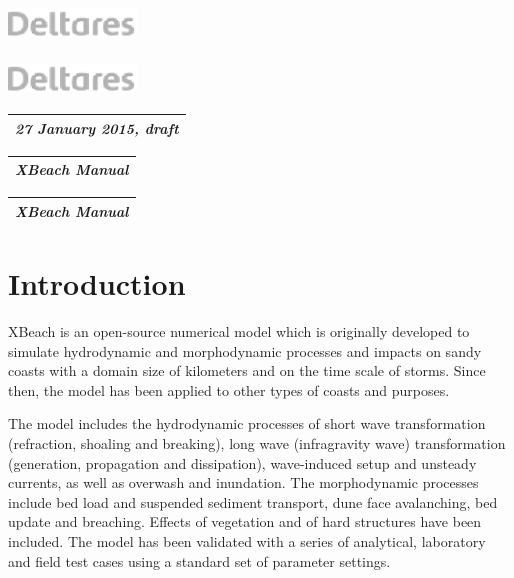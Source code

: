 \documentclass{article}
\begin{document}
\noindent 

\noindent 

\noindent 

\noindent \includegraphics*[width=1.34in, height=0.38in, keepaspectratio=false]{image6}

\noindent 

\noindent 

\noindent 

\noindent \includegraphics*[width=1.34in, height=0.38in, keepaspectratio=false]{image7}

\begin{tabular}{|p{2.7in}|} \hline 
\textit{27 January 2015, draft} \\ \hline 
\end{tabular}



\noindent 

\begin{tabular}{|p{3.5in}|} \hline 
\textit{XBeach Manual} \\ \hline 
\end{tabular}



\noindent 

\begin{tabular}{|p{3.5in}|} \hline 
\textit{XBeach Manual} \\ \hline 
\end{tabular}




\section{  Introduction}

\noindent XBeach is an open-source numerical model which is originally developed to simulate hydrodynamic and morphodynamic processes and impacts on sandy coasts with a domain size of kilometers and on the time scale of storms. Since then, the model has been applied to other types of coasts and purposes.

\noindent 

\noindent The model includes the hydrodynamic processes of short wave transformation (refraction, shoaling and breaking), long wave (infragravity wave) transformation (generation, propagation and dissipation), wave-induced setup and unsteady currents, as well as overwash and inundation. The morphodynamic processes include bed load and suspended sediment transport, dune face avalanching, bed update and breaching. Effects of vegetation and of hard structures have been included. The model has been validated with a series of analytical, laboratory and field test cases using a standard set of parameter settings. 
\end{document}
